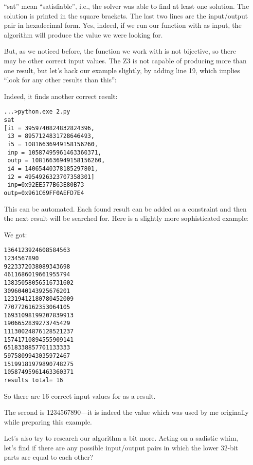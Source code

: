 ``sat'' mean ``satisfiable'', i.e., the solver was able to find at least one solution.
The solution is printed in the square brackets.
The last two lines are the input/output pair in hexadecimal form.
Yes, indeed, if we run our function with  as input,
the algorithm will produce the value we were looking for.

But, as we noticed before, the function we work with is not bijective, so there may be other correct input values.
The Z3 is not capable of producing more than one result, but let's hack our example slightly, 
by adding line 19, which implies ``look for any other results than this'':



Indeed, it finds another correct result:

\begin{lstlisting}
...>python.exe 2.py
sat
[i1 = 3959740824832824396,
 i3 = 8957124831728646493,
 i5 = 10816636949158156260,
 inp = 10587495961463360371,
 outp = 10816636949158156260,
 i4 = 14065440378185297801,
 i2 = 4954926323707358301]
 inp=0x92EE577B63E80B73
outp=0x961C69FF0AEFD7E4
\end{lstlisting}

This can be automated.
Each found result can be added as a constraint and then the next result will be searched for.
Here is a slightly more sophisticated example:



We got:

\begin{lstlisting}
1364123924608584563
1234567890
9223372038089343698
4611686019661955794
13835058056516731602
3096040143925676201
12319412180780452009
7707726162353064105
16931098199207839913
1906652839273745429
11130024876128521237
15741710894555909141
6518338857701133333
5975809943035972467
15199181979890748275
10587495961463360371
results total= 16
\end{lstlisting}

So there are 16 correct input values for  as a result.

The second is 1234567890---it is indeed the value which was used by me originally while preparing this example.

Let's also try to research our algorithm a bit more.
Acting on a sadistic whim, let's find if there are any possible input/output pairs in 
which the lower 32-bit parts are equal to each other?

